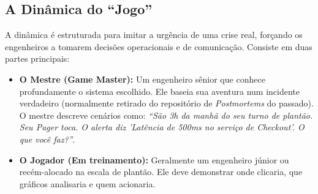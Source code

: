 \documentclass[12pt,a4paper]{report}
\begin{document}
\subsection{A Dinâmica do ``Jogo''}

A dinâmica é estruturada para imitar a urgência de uma crise real, forçando os engenheiros a tomarem decisões operacionais e de comunicação. Consiste em duas partes principais:

\begin{itemize}
    \item \textbf{O Mestre (Game Master):} Um engenheiro sênior que conhece profundamente o sistema escolhido. Ele baseia sua aventura num incidente verdadeiro (normalmente retirado do repositório de \textit{Postmortems} do passado). O mestre descreve cenários como: \textit{``São 3h da manhã do seu turno de plantão. Seu Pager toca. O alerta diz 'Latência de 500ms no serviço de Checkout'. O que você faz?''}.
    \item \textbf{O Jogador (Em treinamento):} Geralmente um engenheiro júnior ou recém-alocado na escala de plantão. Ele deve demonstrar onde clicaria, que gráficos analisaria e quem acionaria.
\end{itemize}
\end{document}
